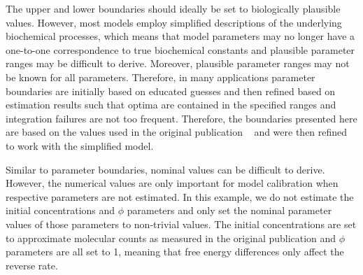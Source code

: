 \documentclass[11pt]{article}
\begin{document}
The upper and lower boundaries should ideally be set to biologically
plausible values. However, most models employ simplified descriptions of
the underlying biochemical processes, which means that model parameters
may no longer have a one-to-one correspondence to true biochemical
constants and plausible parameter ranges may be difficult to derive.
Moreover, plausible parameter ranges may not be known for all
parameters. Therefore, in many applications parameter boundaries are
initially based on educated guesses and then refined based on estimation
results such that optima are contained in the specified ranges and
integration failures are not too frequent. Therefore, the boundaries
presented here are based on the values used in the original publication
~\cite{2754712/I4JQ4DMV} and were then refined to work with the
simplified model.

Similar to parameter boundaries, nominal values can be difficult to
derive. However, the numerical values are only important for model
calibration when respective parameters are not estimated. In this
example, we do not estimate the initial concentrations and \(\phi\)
parameters and only set the nominal parameter values of those parameters
to non-trivial values. The initial concentrations are set to approximate
molecular counts as measured in the original publication and \(\phi\)
parameters are all set to 1, meaning that free energy differences only
affect the reverse rate.
\end{document}
